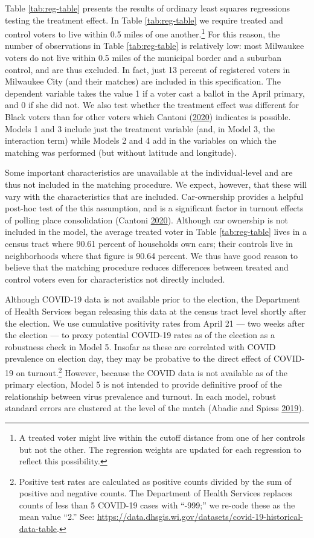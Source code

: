 \documentclass[
  12pt,
]{article}
\begin{document}
Table \ref{tab:reg-table} presents the results of ordinary least squares regressions testing the treatment effect. In Table \ref{tab:reg-table} we require treated and control voters to live within 0.5 miles of one another.\footnote{A treated voter might live within the cutoff distance from one of her controls but not the other. The regression weights are updated for each regression to reflect this possibility.} For this reason, the number of observations in Table \ref{tab:reg-table} is relatively low: most Milwaukee voters do not live within 0.5 miles of the municipal border and a suburban control, and are thus excluded. In fact, just 13 percent of registered voters in Milwaukee City (and their matches) are included in this specification. The dependent variable takes the value 1 if a voter cast a ballot in the April primary, and 0 if she did not. We also test whether the treatment effect was different for Black voters than for other voters which Cantoni (\protect\hyperlink{ref-Cantoni2020}{2020}) indicates is possible. Models 1 and 3 include just the treatment variable (and, in Model 3, the interaction term) while Models 2 and 4 add in the variables on which the matching was performed (but without latitude and longitude).

Some important characteristics are unavailable at the individual-level and are thus not included in the matching procedure. We expect, however, that these will vary with the characteristics that are included. Car-ownership provides a helpful post-hoc test of the this assumption, and is a significant factor in turnout effects of polling place consolidation (Cantoni \protect\hyperlink{ref-Cantoni2020}{2020}). Although car ownership is not included in the model, the average treated voter in Table \ref{tab:reg-table} lives in a census tract where 90.61 percent of households own cars; their controls live in neighborhoods where that figure is 90.64 percent. We thus have good reason to believe that the matching procedure reduces differences between treated and control voters even for characteristics not directly included.

Although COVID-19 data is not available prior to the election, the Department of Health Services began releasing this data at the census tract level shortly after the election. We use cumulative positivity rates from April 21 --- two weeks after the election --- to proxy potential COVID-19 rates as of the election as a robustness check in Model 5. Insofar as these are correlated with COVID prevalence on election day, they may be probative to the direct effect of COVID-19 on turnout.\footnote{Positive test rates are calculated as positive counts divided by the sum of positive and negative counts. The Department of Health Services replaces counts of less than 5 COVID-19 cases with ``-999;'' we re-code these as the mean value ``2.'' See: \url{https://data.dhsgis.wi.gov/datasets/covid-19-historical-data-table}.} However, because the COVID data is not available as of the primary election, Model 5 is not intended to provide definitive proof of the relationship between virus prevalence and turnout. In each model, robust standard errors are clustered at the level of the match (Abadie and Spiess \protect\hyperlink{ref-Abadie2019}{2019}).
\end{document}
